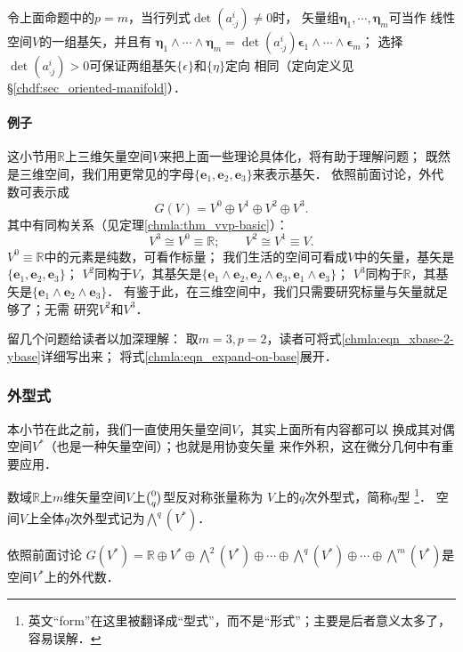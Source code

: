 \begin{remark}\label{chmla:rmk_b2b}
令上面命题中的$p=m$，当行列式$\det(a^{i}_{\cdot j}) \neq 0$时，
矢量组$\boldsymbol{\eta}_1,\cdots,\boldsymbol{\eta}_m$可当作
线性空间$V$的一组基矢，并且有
$\boldsymbol{\eta}_{1} \wedge \cdots \wedge \boldsymbol{\eta}_{m}
=\det(a^{i}_{\cdot j})
\boldsymbol{\epsilon}_{1} \wedge \cdots \wedge\boldsymbol{\epsilon}_{m}$；
选择$\det(a^{i}_{\cdot j}) > 0$可保证两组基矢$\{\epsilon\}$和$\{\eta\}$定向
相同（定向定义见\S \ref{chdf:sec_oriented-manifold}）．
\end{remark}

\paragraph{例子}
这小节用$\mathbb{R}$上三维矢量空间$V$来把上面一些理论具体化，将有助于理解问题；
既然是三维空间，我们用更常见的字母$\{\boldsymbol{e}_1,\boldsymbol{e}_2,\boldsymbol{e}_3\}$来表示基矢．
依照前面讨论，外代数可表示成
\begin{equation}
    G(V)= V^0 \oplus V^1 \oplus V^2 \oplus V^3 .
\end{equation}
其中有同构关系（见定理\ref{chmla:thm_vvp-basic}）：
\begin{equation}
    V^3\cong V^0 \equiv \mathbb{R} ; \qquad  V^2 \cong V^1  \equiv V .
\end{equation}
$V^0 \equiv \mathbb{R}$中的元素是纯数，可看作标量；
我们生活的空间可看成$V$中的矢量，基矢是$\{\boldsymbol{e}_1,\boldsymbol{e}_2,\boldsymbol{e}_3\}$；
$V^2$同构于$V$，其基矢是$\{\boldsymbol{e}_1\wedge \boldsymbol{e}_2,\boldsymbol{e}_2\wedge\boldsymbol{e}_3
,\boldsymbol{e}_1\wedge \boldsymbol{e}_3\}$；
$V^3$同构于$\mathbb{R}$，其基矢是$\{\boldsymbol{e}_1\wedge\boldsymbol{e}_2\wedge\boldsymbol{e}_3\}$．
有鉴于此，在三维空间中，我们只需要研究标量与矢量就足够了；无需
研究$V^2$和$V^3$．

留几个问题给读者以加深理解：
取$m=3,p=2$，读者可将式\eqref{chmla:eqn_xbase-2-ybase}详细写出来；
将式\eqref{chmla:eqn_expand-on-base}展开．

\subsubsection{外型式}\label{chmla:sec_exterior-form}
本小节在此之前，我们一直使用矢量空间$V$，其实上面所有内容都可以
换成其对偶空间$V^*$（也是一种矢量空间）；也就是用协变矢量
来作外积，这在微分几何中有重要应用．
\begin{definition}\label{chmla:def_exterior-form}
    数域$\mathbb{R}$上$m$维矢量空间$V$上$\binom{0}{q}$型{\kaishu 反对称}张量称为
    $V$上的$q$次{\heiti 外型式}，简称$q${\heiti 型}
    {\footnote{英文“form”在这里被翻译成“型式”，而不是“形式”；主要是后者意义太多了，容易误解．}}．
    空间$V$上全体$q$次外型式记为$\bigwedge^q (V^*)$．
\end{definition}
依照前面讨论
$G(V^*)=\mathbb{R} \oplus V^* \oplus \bigwedge^2 (V^*) \oplus  \cdots
  \oplus \bigwedge^q (V^*)\oplus \cdots \oplus \bigwedge^m (V^*) $是
空间$V^*$上的外代数．

